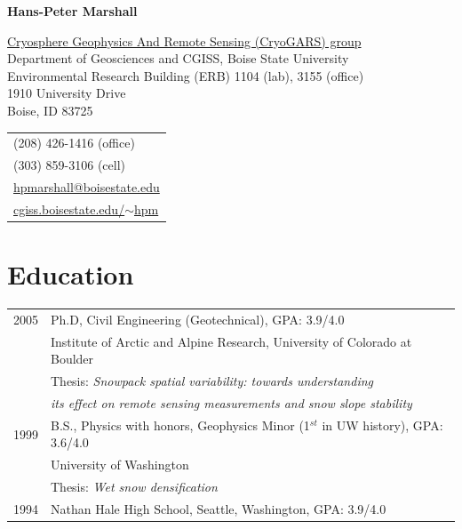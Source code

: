 \documentclass[11pt]{article}
\def\name{Hans-Peter Marshall}
\begin{document}


\centerline{\Large \bf \name}

\vspace{0.25in}

\begin{minipage}{0.70\linewidth}
  \href{http://earth.boisestate.edu/cryogars/}{Cryosphere Geophysics And Remote Sensing (CryoGARS) group} \\
  Department of Geosciences and CGISS, Boise State University \\
  Environmental Research Building (ERB) 1104 (lab), 3155 (office) \\
  1910 University Drive \\
  Boise, ID  83725
\end{minipage}
\begin{minipage}{0.30\linewidth}
  \begin{tabular}{l}
     (208) 426-1416 (office) \\
     (303) 859-3106 (cell) \\
    \href{mailto:hpmarshall@boisestate.edu}{hpmarshall@boisestate.edu} \\
    \href{http://cgiss.boisestate.edu/~hpm}{cgiss.boisestate.edu/$\sim$hpm} \\
  \end{tabular}
\end{minipage}

\section*{Education}
\begin{tabular}{ll}
	2005 & Ph.D, Civil Engineering (Geotechnical), GPA: 3.9/4.0 \\
	          & Institute of Arctic and Alpine Research, University of Colorado at Boulder \\
		 & Thesis: \textit{Snowpack spatial variability: towards understanding} \\
                  &   \textit{its effect on remote sensing measurements and snow slope stability} \\
	1999 &  B.S., Physics with honors, Geophysics Minor (1$^{st}$ in UW history), GPA: 3.6/4.0 \\
	         &   University of Washington \\
	         &  Thesis: \textit{Wet snow densification} \\
       1994  &  Nathan Hale High School, Seattle, Washington, GPA: 3.9/4.0 \\
\end{tabular}
\end{document}
